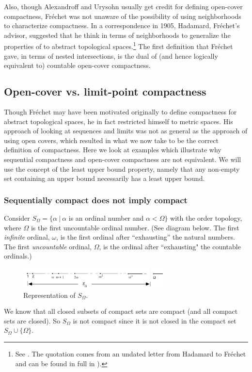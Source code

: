 \documentclass[12pt]{article}
\begin{document}
Also, though Alexandroff and Urysohn usually get credit for defining open-cover
compactness, Fr\'{e}chet was not unaware of the possibility of using neighborhoods to
characterize compactness. In a correspondence in 1905, Hadamard, Fr\'{e}chet's advisor, suggested that
he think in terms of neighborhoods to generalize the properties of to abstract topological spaces.\footnote{See \cite[p. 212]{koet}. The quotation comes from an undated letter from Hadamard to Fr\'{e}chet and can be found in full in \cite[p. 246]{tay1}).} The first definition that Fr\'{e}chet gave, in terms
of nested intersections, is the dual of (and hence logically equivalent to) countable
open-cover compactness. 



\subsection{Open-cover vs. limit-point compactness}

Though Fr\'{e}chet may have been motivated originally to define compactness for
abstract topological spaces, he in fact restricted himself to metric spaces.  His approach
of looking at sequences and limits was not as general as the approach of using open covers,
which resulted in what we now take to be the correct definition of compactness.  Here we look 
at examples which illustrate why sequential compactness and open-cover compactness are not equivalent. We will use the concept of the least upper bound property, namely that any non-empty set containing an upper bound necessarily has a least upper bound.

\subsubsection{Sequentially compact does not imply compact}
Consider $S_\Omega =\{ \alpha \:|\: \alpha$ is an ordinal number and $\alpha < \Omega
\}$  with the order topology, where
$\Omega$ is the first uncountable ordinal number.  (See diagram below.  The first
{\em infinite} ordinal,
$\omega$, is the first ordinal after ``exhausting'' the natural numbers.  The first
{\em uncountable} ordinal,
$\Omega$, is the ordinal after ``exhausting" the countable ordinals.)\\

\begin{figure}[h]
\label{fig5}
  \begin{center}
   \includegraphics[width=3in]{somega.pdf}
  \end{center}
  \caption{Representation of $S_\Omega$.}
  \end{figure}
We know that all closed subsets of compact sets are compact (and all compact sets are closed).  So
$S_\Omega$  is not compact since it is not closed in the compact set $S_\Omega
\cup \{\Omega\}$.
\end{document}
